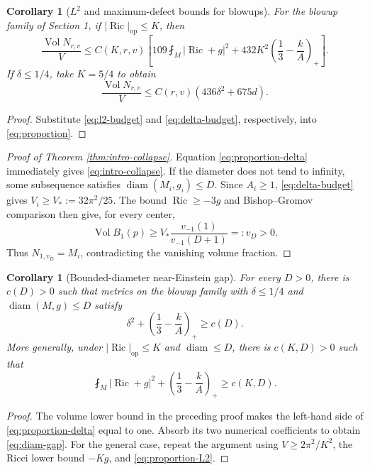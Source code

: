 \documentclass[a4paper,11pt]{article}
\theoremstyle{paper}
\newtheorem{corollary}[theorem]{Corollary}
\DeclareMathOperator{\Ric}{Ric}
\DeclareMathOperator{\Vol}{Vol}
\DeclareMathOperator{\diam}{diam}
\newcommand{\op}{\mathrm{op}}
\newcommand{\av}{\fint}
\numberwithin{equation}{section}
\begin{document}
\begin{corollary}[$L^2$ and maximum-defect bounds for blowups]\label{cor:quant-collapse}
For the blowup family of Section 1, if $|\Ric|_{\op}\le K$, then
\begin{equation}\label{eq:proportion-L2}
\frac{\Vol N_{r,v}}V\le C(K,r,v)
\left[109\av_M|\Ric+g|^2+432K^2\left(\frac13-\frac{k}{A}\right)_+\right].
\end{equation}
If $\delta\le1/4$, take $K=5/4$ to obtain
\begin{equation}\label{eq:proportion-delta}
\boxed{\frac{\Vol N_{r,v}}V\le C(r,v)(436\delta^2+675d).}
\end{equation}
\end{corollary}
\begin{proof}
Substitute \eqref{eq:l2-budget} and \eqref{eq:delta-budget}, respectively, into \eqref{eq:proportion}.
\end{proof}

\begin{proof}[Proof of Theorem \ref{thm:intro-collapse}]
Equation \eqref{eq:proportion-delta} immediately gives \eqref{eq:intro-collapse}. If the diameter does not tend to infinity, some subsequence satisfies $\diam(M_i,g_i)\le D$. Since $A_i\ge1$, \eqref{eq:delta-budget} gives
$V_i\ge V_*:=32\pi^2/25$. The bound $\Ric\ge-3g$ and Bishop--Gromov comparison then give, for every center,
\[
\Vol B_1(p)\ge V_*\frac{v_{-1}(1)}{v_{-1}(D+1)}=:v_D>0.
\]
Thus $N_{1,v_D}=M_i$, contradicting the vanishing volume fraction.
\end{proof}

\begin{corollary}[Bounded-diameter near-Einstein gap]\label{cor:diam}
For every $D>0$, there is $c(D)>0$ such that metrics on the blowup family with $\delta\le1/4$ and $\diam(M,g)\le D$ satisfy
\begin{equation}\label{eq:diam-gap}
\delta^2+\left(\frac13-\frac{k}{A}\right)_+\ge c(D).
\end{equation}
More generally, under $|\Ric|_{\op}\le K$ and $\diam\le D$, there is $c(K,D)>0$ such that
\begin{equation}\label{eq:diam-L2}
\av_M|\Ric+g|^2+\left(\frac13-\frac{k}{A}\right)_+\ge c(K,D).
\end{equation}
\end{corollary}
\begin{proof}
The volume lower bound in the preceding proof makes the left-hand side of \eqref{eq:proportion-delta} equal to one. Absorb its two numerical coefficients to obtain \eqref{eq:diam-gap}. For the general case, repeat the argument using $V\ge2\pi^2/K^2$, the Ricci lower bound $-Kg$, and \eqref{eq:proportion-L2}.
\end{proof}
\end{document}
